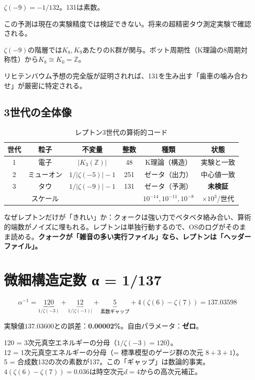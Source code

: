\documentclass[12pt,a4paper]{article}
\begin{document}
$\zeta(-9) = -1/132$。131は素数。

この予測は現在の実験精度では検証できない。将来の超精密タウ測定実験で確認される。

\begin{mathbox}[タウの背後の「歯車」]
$\zeta(-9)$の階層では$K_8, K_9$あたりのK群が関与。ボット周期性（K理論の8周期対称性）から$K_8 \cong K_0 = \mathbb{Z}$。

リヒテンバウム予想の完全版が証明されれば、131を生み出す「歯車の噛み合わせ」が厳密に特定される。
\end{mathbox}

\subsection{3世代の全体像}

\begin{table}[h]
\centering
\caption{レプトン3世代の算術的コード}
\begin{tabular}{@{}cccccc@{}}
\toprule
世代 & 粒子 & 不変量 & 整数 & 種類 & 状態 \\
\midrule
1 & 電子 & $|K_3(\mathbb{Z})|$ & 48 & K理論（構造） & 実験と一致 \\
2 & ミューオン & $1/|\zeta(-5)| - 1$ & 251 & ゼータ（出力） & 中心値一致 \\
3 & タウ & $1/|\zeta(-9)| - 1$ & 131 & ゼータ（予測） & \textbf{未検証} \\
\midrule
& スケール & & & $10^{-14}, 10^{-11}, 10^{-8}$ & $\times 10^3$/世代 \\
\bottomrule
\end{tabular}
\end{table}

なぜレプトンだけが「きれい」か：クォークは強い力でベタベタ絡み合い、算術的端数がノイズに埋もれる。レプトンは単独行動するので、OSのログがそのまま読める。\textbf{クォークが「雑音の多い実行ファイル」なら、レプトンは「ヘッダーファイル」。}

\section{微細構造定数 α = 1/137}

$$\alpha^{-1} = \underbrace{120}_{1/\zeta(-3)} + \underbrace{12}_{1/|\zeta(-1)|} + \underbrace{5}_{\text{素数ギャップ}} + 4(\zeta(6) - \zeta(7)) = 137.03598$$

実験値$137.03600$との誤差：\textbf{0.00002\%}。自由パラメータ：\textbf{ゼロ}。

120 = 3次元真空エネルギーの分母（$1/\zeta(-3) = 120$）。\\
12 = 1次元真空エネルギーの分母（= 標準模型のゲージ群の次元 $8+3+1$）。\\
5 = 合成数132の次の素数が137。この「ギャップ」は数論的事実。\\
$4(\zeta(6)-\zeta(7)) = 0.036$は時空次元$d=4$からの高次元補正。
\end{document}
